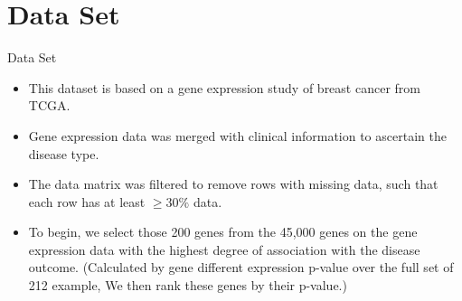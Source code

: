 \documentclass[xcolor=table]{beamer}
\numberwithin{figure}{section}
\numberwithin{equation}{section}
\begin{document}

\section{Data Set}

\begin{frame}{Data Set}
  \begin{itemize}
      \item This dataset is based on a gene expression study of breast cancer from TCGA. 
      \item Gene expression data was merged with clinical information to ascertain the disease type. 
      \item The data matrix was filtered to remove rows with missing data, such that each row has at least $\geq 30\%$ data.
      \item To begin, we select those 200 genes from the 45,000 genes on the gene expression data with the highest degree of association with the disease outcome. (Calculated by gene different expression p-value over the full set of 212 example, We then rank these genes by their p-value.) %
  \end{itemize}
 
\end{frame}
\end{document}
